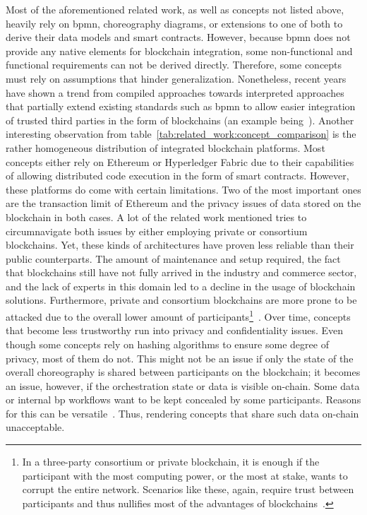Most of the aforementioned related work, as well as concepts not listed above, heavily rely on \gls{bpmn}, choreography diagrams, or extensions to one of both to derive their data models and smart contracts. However, because \gls{bpmn} does not provide any native elements for blockchain integration, some non-functional and functional requirements can not be derived directly. Therefore, some concepts must rely on assumptions that hinder generalization. Nonetheless, recent years have shown a trend from compiled approaches towards interpreted approaches that partially extend existing standards such as \gls{bpmn} to allow easier integration of trusted third parties in the form of blockchains (an example being~\cite{modeling_blockchain_based_choreographies}). Another interesting observation from table~\ref{tab:related_work:concept_comparison} is the rather homogeneous distribution of integrated blockchain platforms. Most concepts either rely on Ethereum or Hyperledger Fabric due to their capabilities of allowing distributed code execution in the form of smart contracts. However, these platforms do come with certain limitations. Two of the most important ones are the transaction limit of Ethereum and the privacy issues of data stored on the blockchain in both cases. A lot of the related work mentioned tries to circumnavigate both issues by either employing private or consortium blockchains. Yet, these kinds of architectures have proven less reliable than their public counterparts. The amount of maintenance and setup required, the fact that blockchains still have not fully arrived in the industry and commerce sector, and the lack of experts in this domain led to a decline in the usage of blockchain solutions. Furthermore, private and consortium blockchains are more prone to be attacked due to the overall lower amount of participants\footnote{In a three-party consortium or private blockchain, it is enough if the participant with the most computing power, or the most at stake, wants to corrupt the entire network. Scenarios like these, again, require trust between participants and thus nullifies most of the advantages of blockchains~\cite{lamport2002}.}~\cite{public_chains_make_private_chains_obsolete}. Over time, concepts that become less trustworthy run into privacy and confidentiality issues. Even though some concepts rely on hashing algorithms to ensure some degree of privacy, most of them do not. This might not be an issue if only the state of the overall choreography is shared between participants on the blockchain; it becomes an issue, however, if the orchestration state or data is visible on-chain. Some data or internal \gls{bp} workflows want to be kept concealed by some participants. Reasons for this can be versatile~\cite{impact_of_trust_on_supply_chains}. Thus, rendering concepts that share such data on-chain unacceptable.

